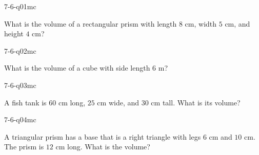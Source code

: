 

\begin{practiceQuestion}{7-6-q01}{mc}
\begin{questionText}
What is the volume of a rectangular prism with length $8$ cm, width $5$ cm, and height $4$ cm?
\end{questionText}
\end{practiceQuestion}

\begin{practiceQuestion}{7-6-q02}{mc}
\begin{questionText}
What is the volume of a cube with side length $6$ m?
\end{questionText}
\end{practiceQuestion}

\begin{practiceQuestion}{7-6-q03}{mc}
\begin{questionText}
A fish tank is $60$ cm long, $25$ cm wide, and $30$ cm tall. What is its volume?
\end{questionText}
\end{practiceQuestion}

\begin{practiceQuestion}{7-6-q04}{mc}
\begin{questionText}
A triangular prism has a base that is a right triangle with legs $6$ cm and $10$ cm. The prism is $12$ cm long. What is the volume?
\end{questionText}
\end{practiceQuestion}

